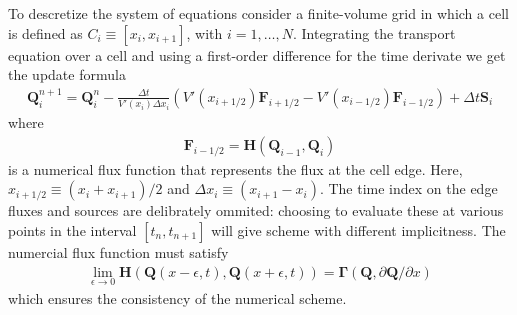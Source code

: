 \documentclass[11pt]{amsart}
\newcommand{\pfracb}[2]{\partial #1/\partial #2}
\newcommand{\mvec}[1]{\mathbf{#1}}
\begin{document}
To descretize the system of equations consider a finite-volume grid in
which a cell is defined as $C_i \equiv [x_i, x_{i+1}]$, with
$i=1,\ldots,N$. Integrating the transport equation over a
cell and using a first-order difference for the time derivate we get
the update formula
\begin{align}
  \mvec{Q}_i^{n+1} = \mvec{Q}^n_i - \frac{\Delta t}{V'(x_i) \Delta x_i}
  \left (
    V'(x_{i+1/2}) \mvec{F}_{i+1/2} - 
    V'(x_{i-1/2}) \mvec{F}_{i-1/2}
  \right)
  +
  \Delta t \mvec{S}_i \label{eqn:update-form}
\end{align}
where
\begin{align}
  \mvec{F}_{i-1/2} = 
  \mvec{H}(
  \mvec{Q}_{i-1},
  \mvec{Q}_i
  ) \label{eqn:flux-func}
\end{align}
is a numerical flux function that represents the flux at the cell
edge. Here, $x_{i+1/2} \equiv (x_i+x_{i+1})/2$ and $\Delta x_i \equiv
(x_{i+1}-x_i)$. The time index on the edge fluxes and sources are
delibrately ommited: choosing to evaluate these at various points in
the interval $[t_n,t_{n+1}]$ will give scheme with different
implicitness. The numercial flux function must satisfy
\begin{align}
  \lim_{\epsilon\rightarrow 0} \mvec{H}
  \left(
    \mvec{Q}(x-\epsilon,t),
    \mvec{Q}(x+\epsilon,t)
  \right)
  =
  \mvec{\Gamma}(\mvec{Q},\pfracb{\mvec{Q}}{x})
\end{align}
which ensures the consistency of the numerical scheme.
\end{document}
